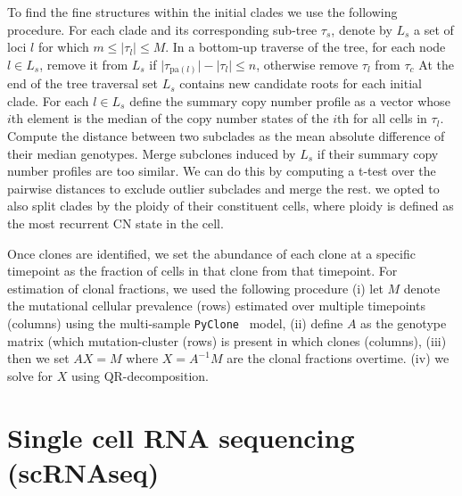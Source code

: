 To find the fine structures within the initial clades we use the following procedure.
For each clade and its corresponding sub-tree $\tau_s$, denote by $L_s$ a set of loci $l$ for which $m \le \lvert \tau_l \rvert \le M$. 
In a bottom-up traverse of the tree, for each node $l \in L_s$, remove it from $L_s$ if $\lvert \tau_{\text{pa}(l)} \rvert - \lvert \tau_{l} \rvert \le n$, otherwise remove $\tau_{l}$ from $\tau_c$
At the end of the tree traversal set $L_s$ contains new candidate roots for each initial clade.
For each $l \in L_s$ define the summary copy number profile as a vector whose $i$th element is the median of the copy number states of the $i$th for all cells in $\tau_{l}$.
Compute the distance between two subclades as the mean absolute difference of their median genotypes.
Merge subclones induced by $L_s$ if their summary copy number profiles are too similar.
We can do this by computing a t-test over the pairwise distances to exclude outlier subclades and merge the rest. we opted to also split clades by the ploidy of their constituent cells, where ploidy is defined as the most recurrent CN state in the cell.  

Once clones are identified, we set the abundance of each clone at a specific timepoint as the fraction of cells in that clone from that timepoint.
For estimation of clonal fractions, we used the following procedure (i) let $M$ denote the mutational cellular prevalence (rows) estimated over multiple timepoints (columns) using the multi-sample \texttt{PyClone}~\cite{roth2014pyclone} model, (ii) define $A$ as the genotype matrix (which mutation-cluster (rows) is present in which clones (columns), (iii) then we set $A X = M$ where $ X = A^{-1}M$ are the clonal fractions overtime. (iv) we solve for $X$ using QR-decomposition.


\section{Single cell RNA sequencing (scRNAseq)}


